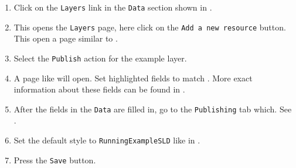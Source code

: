 \begin{minipage}{.45\textwidth}
	\begin{enumerate}[resume]
		\item Click on the \lstinline|Layers| link in the \lstinline|Data| section shown in .
		\item This opens the \lstinline|Layers| page, here click on the \lstinline|Add a new resource| button. This open a page similar to .
		\item Select the \lstinline|Publish| action for the example layer.
		\item A page like  will open. Set highlighted fields to match . More exact information about these fields can be found in .
		\item After the fields in the \lstinline|Data| are filled in, go to the \lstinline|Publishing| tab which. See .
		\item Set the  default style to \lstinline|RunningExampleSLD| like in .
		\item Press the \lstinline|Save| button.
	\end{enumerate}
\end{minipage}\hfill
